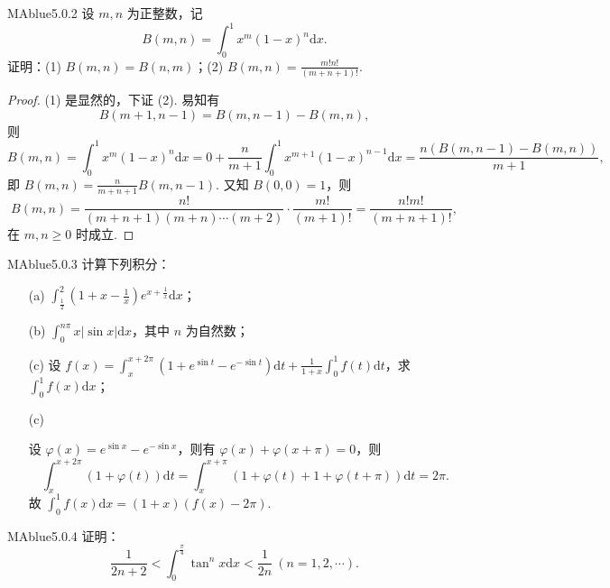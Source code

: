 \begin{problem}{MAblue}{5.0.2}
    设 $m, n$ 为正整数，记
    \[
        B(m, n) = \int_0^1 x^m(1-x)^n \mathrm dx.
    \]
    证明：(1) $B(m, n) = B(n, m)$；\quad(2) $B(m, n) = \frac{m!n!}{(m+n+1)!}$.
\end{problem}

\begin{proof}
    (1) 是显然的，下证 (2). 易知有
    \[
        B(m+1, n-1) = B(m, n-1) - B(m, n),
    \]
    则
    {\small
        \[
            B(m, n) = \int_0^1 x^m (1-x)^n \mathrm dx = 0 + \frac n {m+1} \int_0^1 x^{m+1} (1-x)^{n-1} \mathrm dx = \frac{n (B(m, n-1) - B(m, n))}{m+1},
        \]
    }
    {\flushleft 即 $B(m, n) = \frac n {m+n+1} B(m, n-1)$. 又知 $B(0, 0) = 1$，则}
    \[
        B(m, n) = \frac{n!}{(m+n+1)(m+n) \cdots (m+2)} \cdot \frac{m!}{(m+1)!} = \frac{n!m!}{(m+n+1)!},
    \]
    在 $m, n \geqslant 0$ 时成立.
\end{proof}

\begin{problem}{MAblue}{5.0.3}
    计算下列积分：
    \begin{enumerate}
        \item[(a)]
        $\displaystyle \int_{\frac 1 2}^2 \left( 1 + x - \frac 1 x \right)e^{x+\frac 1 x} \mathrm dx$；
        \item[(b)]
        $\displaystyle \int_0^{n\pi} x|\sin x| \mathrm dx$，其中 $n$ 为自然数；
        \item[(c)]
        设 $\displaystyle f(x) = \int_x^{x+2\pi} \left( 1 + e^{\sin t} - e^{-\sin t} \right) \mathrm dt + \frac 1 {1+x} \int_0^1 f(t) \mathrm dt$，求 $\displaystyle \int_0^1 f(x) \mathrm dx$；
    \end{enumerate}
\end{problem}

\begin{enumerate}
    \item[(c)]
    \begin{solution}
        设 $\varphi(x) = e^{\sin x} - e^{-\sin x}$，则有 $\varphi(x) + \varphi(x+\pi) = 0$，则
        \[
            \int_x^{x+2\pi} (1 + \varphi(t)) \mathrm dt = \int_x^{x+\pi} (1 + \varphi(t) + 1 + \varphi(t+\pi)) \mathrm dt = 2\pi.
        \]
        故 $\int_0^1 f(x) \mathrm dx = (1 + x)(f(x) - 2\pi)$.
    \end{solution}
\end{enumerate}

\begin{problem}{MAblue}{5.0.4}
    证明：
    \[
        \frac 1 {2n+2} < \int_0^{\frac \pi 4} \tan^n x \mathrm dx < \frac 1 {2n} \ (n = 1, 2, \cdots).
    \]
\end{problem}

